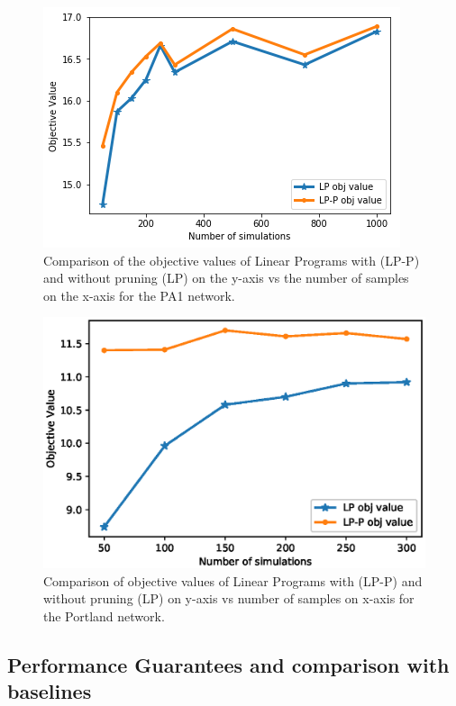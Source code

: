 \begin{figure}[!h]
    \centering
    \includegraphics[scale = 0.52]{Figuresnew/pa1_objpruning}
    \caption{Comparison of the objective values of Linear Programs with (LP-P) and without pruning (LP) on the y-axis
vs the number of samples on the x-axis for the PA1 network. }
    \label{fig:pa1pruningobj}
\end{figure}

\begin{figure}[!h]
    \centering
    \includegraphics[scale = 0.52]{Figuresnew/portland_obj.eps}
    \caption{Comparison of objective values of Linear Programs with (LP-P) and without pruning (LP) on y-axis vs 
number of samples on x-axis for the Portland network. }
    \label{fig:portlandobj}
\end{figure}

\subsection{Performance Guarantees and comparison with baselines}

